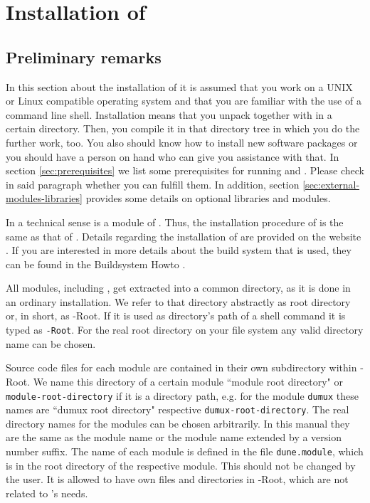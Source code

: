 \section{Installation of \Dumux} \label{install}
\subsection{Preliminary remarks}

In this section about the installation of \Dumux it is assumed that you work on a UNIX or Linux compatible operating system
and that you are familiar with the use of a command line shell. Installation means that you unpack \Dune together with \Dumux in a certain directory.
Then, you compile it in that directory tree in which you do the further work, too. You also should know how to install new software packages
or you should have a person on hand who can give you assistance with that. In section \ref{sec:prerequisites} we list some prerequisites for running \Dune and \Dumux. 
Please check in said paragraph whether you can fulfill them. In addition, section \ref{sec:external-modules-libraries} provides some details on optional libraries and modules.

In a technical sense \Dumux is a module of \Dune. 
Thus, the installation procedure of \Dumux is the same as that of \Dune. 
Details regarding the installation of \Dune are provided on the \Dune website \cite{DUNE-INST}. 
If you are interested in more details about the build system that is used,
they can be found in the {\Dune} Buildsystem Howto \cite{DUNE-BS}.


All \Dune modules, including \Dumux, get extracted into a common directory, as it is done in an ordinary \Dune installation. 
We refer to that directory abstractly as {\Dune} root directory or, in short, as {\Dune}-Root. 
If it is used as directory's path of a shell command it is typed as \texttt{\Dune-Root}. 
For the real {\Dune} root directory on your file system any valid directory name can be chosen.

Source code files for each \Dune module are contained in their own subdirectory within {\Dune}-Root.
We name this directory of a certain module ``module root directory" or \texttt{module-root-directory} if it is a directory path,
e.g. for the module \texttt{dumux} these names are  ``dumux root directory" respective \texttt{dumux-root-directory}.
The real directory names for the modules can be chosen arbitrarily. In this manual they are the same as the
module name or the module name extended by a version number suffix.
The name of each \Dune module is defined in the file \texttt{dune.module}, which is in the root
directory of the respective module. This should not be changed by the user. 
It is allowed to have own files and directories in \Dune-Root, which are not related to \Dune's needs.

